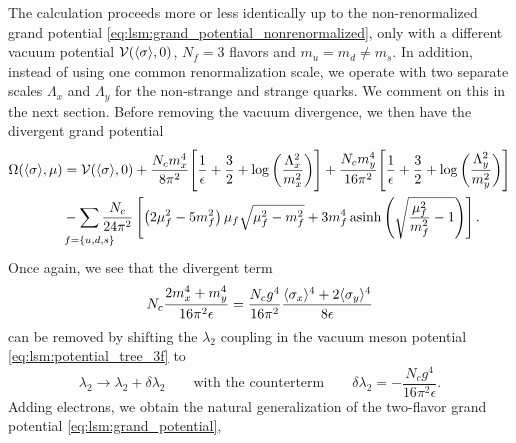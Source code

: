 The calculation proceeds more or less identically up to the non-renormalized grand potential \eqref{eq:lsm:grand_potential_nonrenormalized},
only with a different vacuum potential $\mathcal{V}(\langle \sigma \rangle,0)$, $N_f=3$ flavors and $m_u = m_d \neq m_s$.
In addition, instead of using one common renormalization scale,
we operate with two separate scales $\Lambda_x$ and $\Lambda_y$ for the non-strange and strange quarks.
We comment on this in the next section.
Before removing the vacuum divergence, we then have the divergent grand potential
\begin{equation}
\begin{split}
	\Omega(\avg{\sigma},\mu) &= \pot(\avg{\sigma},0) + \frac{N_c m_x^4}{8 \pi^2} \Bigg[ \frac{1}{\epsilon} + \frac{3}{2} + \log\bigg(\frac{\Lambda_x^2}{m_x^2}\bigg) \Bigg] + \frac{N_c m_y^4}{16 \pi^2} \Bigg[ \frac{1}{\epsilon} + \frac{3}{2} + \log\bigg(\frac{\Lambda_y^2}{m_y^2}\bigg) \Bigg] \\ %
	                         &-\smashoperator{\sum_{\vphantom{\big|} f=\{u,d,s\}}} \frac{N_c}{24 \pi^2} \left[ \left( 2 \mu_f^2 - 5 m_f^2 \right) \mu_f \sqrt{\mu_f^2 - m_f^2} + 3 m_f^4 \asinh \left( \sqrt{\frac{\mu_{\smash{f}}^2}{m_f^2}-1} \right) \right]. \\
\end{split}
\end{equation}
Once again, we see that the divergent term
\begin{equation}
	N_c \frac{2 m_x^4 + m_y^4}{16 \pi^2 \epsilon} =
	\frac{N_c g^4}{16 \pi^2} \frac{\langle \sigma_x \rangle^4 + 2 \langle \sigma_y \rangle^4}{8 \epsilon}
\end{equation}
can be removed by shifting the $\lambda_2$ coupling in the vacuum meson potential \eqref{eq:lsm:potential_tree_3f} to
\begin{equation}
	\lambda_2 \rightarrow \lambda_2 + \delta\lambda_2 \qquad \text{with the counterterm} \qquad \delta\lambda_2 = -\frac{N_c g^4}{16 \pi^2 \epsilon} .
\end{equation}
Adding electrons, we obtain the natural generalization of the two-flavor grand potential \eqref{eq:lsm:grand_potential},
